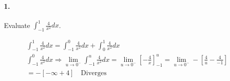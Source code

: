 


\renewcommand\assignment{Homework Set VII, Due Friday, March 3, 2023}


    \iffalse
    \begin{equation*}
        \begin{gathered}
            Equations go here.
        \end{gathered}
    \end{equation*}

    \resizebox{\hsize}{!}{$Long equation goes here$}

    \begin{multicol*}{# of columns}
    \end{multicol*}

    \horizontal

    \fi


    \paragraph*{1.}
    Evaluate $\int_{-1}^{1}\frac{4}{x^2}dx$.
    \\
    \begin{mdframed}
        \begin{equation*}
            \begin{gathered}
                \int_{-1}^{1}\frac{4}{x^2}dx = \int_{-1}^{0}\frac{4}{x^2}dx + \int_{0}^{1}\frac{4}{x^2}dx   \\
                \int_{-1}^{0}\frac{4}{x^2}dx \Rightarrow \lim_{u \to 0^{-}}\int_{-1}^{u}\frac{4}{x^2}dx = \lim_{u \to 0^{-}}\left[-\frac{4}{x}\right]_{-1}^{u} = \lim_{u \to 0^{-}}-\left[\frac{4}{u} - \frac{4}{-1}\right] \\
                = -\left[-\infty + 4\right] \quad \boxed{\text{Diverges}}
            \end{gathered}
        \end{equation*}
    \end{mdframed}

